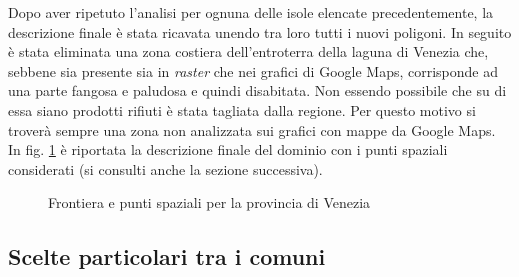 \documentclass[a4paper,11pt,twoside,openright]{book}							%
\begin{document}
Dopo aver ripetuto l'analisi per ognuna delle isole elencate precedentemente, la descrizione finale è stata ricavata unendo tra loro tutti i nuovi poligoni. In seguito è stata eliminata una zona costiera dell'entroterra della laguna di Venezia che, sebbene sia presente sia in \textit{raster} che nei grafici di Google Maps, corrisponde ad una parte fangosa e paludosa e quindi disabitata. Non essendo possibile che su di essa siano prodotti rifiuti è stata tagliata dalla regione. Per questo motivo si troverà sempre una zona non analizzata sui grafici con mappe da Google Maps. In fig. \ref{fig:Ven_rgm} è riportata la descrizione finale del dominio con i punti spaziali considerati (si consulti anche la sezione successiva).
\begin{figure}[t]
	\centering
	\caption{Frontiera e punti spaziali per la provincia di Venezia}
	\label{fig:Ven_rgm}
\end{figure}

\subsection{Scelte particolari tra i comuni}
\label{sez:comunireplicati}
\end{document}
